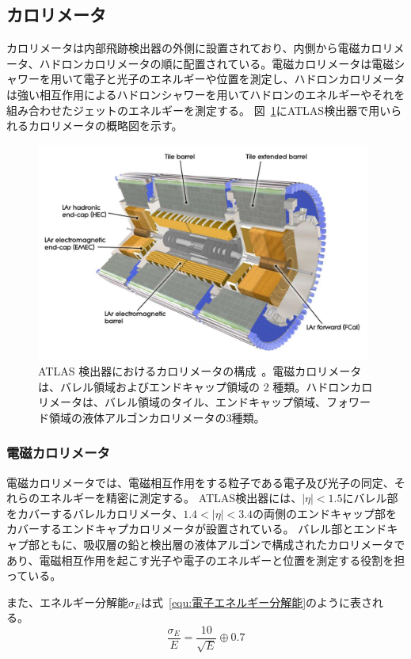 \subsection{カロリメータ}
カロリメータは内部飛跡検出器の外側に設置されており、内側から電磁カロリメータ、ハドロンカロリメータの順に配置されている。電磁カロリメータは電磁シャワーを用いて電子と光子のエネルギーや位置を測定し、ハドロンカロリメータは強い相互作用によるハドロンシャワーを用いてハドロンのエネルギーやそれを組み合わせたジェットのエネルギーを測定する。
図~\ref{fig:カロリメータ}にATLAS検出器で用いられるカロリメータの概略図を示す。

\begin{figure}[tb]
  \centering
  \includegraphics[clip, width=11cm]{fig/2/Calorimeter_d3.pdf}
  \caption{ATLAS 検出器におけるカロリメータの構成~\cite{Aad:1129811}。電磁カロリメータは、バレル領域およびエンドキャップ領域の 2 種類。ハドロンカロリメータは、バレル領域のタイル、エンドキャップ領域、フォワード領域の液体アルゴンカロリメータの3種類。}
  \label{fig:カロリメータ}
\end{figure}

\subsubsection{電磁カロリメータ}
電磁カロリメータでは、電磁相互作用をする粒子である電子及び光子の同定、それらのエネルギーを精密に測定する。
ATLAS検出器には、$|\eta|<1.5$にバレル部をカバーするバレルカロリメータ、$1.4<|\eta|<3.4$の両側のエンドキャップ部をカバーするエンドキャプカロリメータが設置されている。
バレル部とエンドキャプ部ともに、吸収層の鉛と検出層の液体アルゴンで構成されたカロリメータであり、電磁相互作用を起こす光子や電子のエネルギーと位置を測定する役割を担っている。

また、エネルギー分解能$\sigma_{E}$は式~\eqref{equ:電子エネルギー分解能}のように表される。
\begin{equation}
    \frac{\sigma_{E}}{E} = \frac{10}{\sqrt{E}}\oplus 0.7
　\label{equ:電子エネルギー分解能}
\end{equation}




